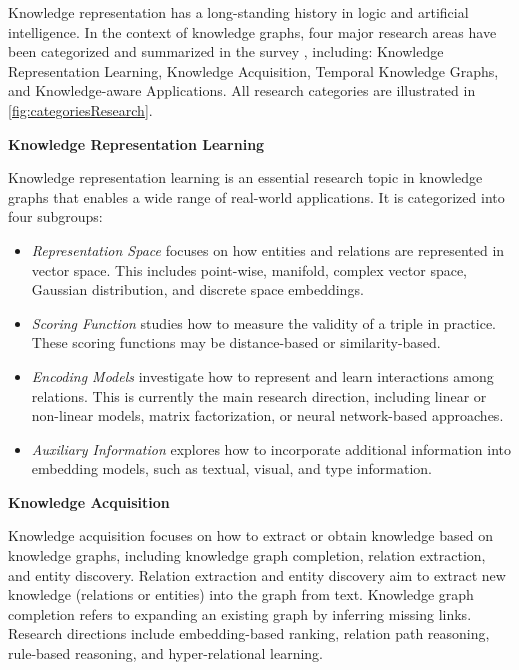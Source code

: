 Knowledge representation has a long-standing history in logic and artificial intelligence. In the context of knowledge graphs, four major research areas have been categorized and summarized in the survey \cite{ji2020survey}, including: Knowledge Representation Learning, Knowledge Acquisition, Temporal Knowledge Graphs, and Knowledge-aware Applications. All research categories are illustrated in \autoref{fig:categoriesResearch}.

\textbf{Knowledge Representation Learning}

Knowledge representation learning is an essential research topic in knowledge graphs that enables a wide range of real-world applications. It is categorized into four subgroups:

\begin{itemize}
	\item \textit{Representation Space} focuses on how entities and relations are represented in vector space. This includes point-wise, manifold, complex vector space, Gaussian distribution, and discrete space embeddings.
	
	\item \textit{Scoring Function} studies how to measure the validity of a triple in practice. These scoring functions may be distance-based or similarity-based.
	
	\item \textit{Encoding Models} investigate how to represent and learn interactions among relations. This is currently the main research direction, including linear or non-linear models, matrix factorization, or neural network-based approaches.
	
	\item \textit{Auxiliary Information} explores how to incorporate additional information into embedding models, such as textual, visual, and type information.
\end{itemize}

\textbf{Knowledge Acquisition}

Knowledge acquisition focuses on how to extract or obtain knowledge based on knowledge graphs, including knowledge graph completion, relation extraction, and entity discovery. Relation extraction and entity discovery aim to extract new knowledge (relations or entities) into the graph from text. Knowledge graph completion refers to expanding an existing graph by inferring missing links. Research directions include embedding-based ranking, relation path reasoning, rule-based reasoning, and hyper-relational learning.

